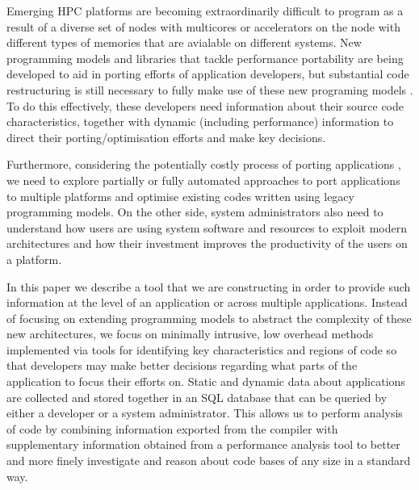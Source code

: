 Emerging HPC platforms are becoming extraordinarily difficult to program as a result of a diverse set of nodes with multicores or accelerators on the node with different types of memories that are avialable on different systems.
New programming models and libraries that tackle performance portability are being developed to aid in porting efforts of application developers, but substantial code restructuring is still necessary to fully make use of these new programing models \cite{anantharaj2013}\cite{titan}.
To do this effectively, these developers need information about their source code characteristics, together with dynamic (including performance) information to direct their porting/optimisation efforts and make key decisions.



Furthermore, considering the potentially costly process of porting applications \cite{larrea2016early}, we need to explore partially or fully automated approaches to port applications to multiple platforms and optimise existing codes written using legacy programming models.
On the other side, system administrators also need to understand how users are using system software and resources to exploit modern architectures and how their investment improves the productivity of the users on a platform.

In this paper we describe a tool that we are constructing in order to provide such information at the level of an application or across multiple applications.
Instead of focusing on extending programming models to abstract the complexity of these new architectures, we focus on minimally intrusive, low overhead methods implemented via tools for identifying key characteristics and regions of code so that developers may make better decisions regarding what parts of the application to focus their efforts on.
Static and dynamic data about applications are collected and stored together in an \acs{SQL} database that can be queried by either a developer or a system administrator.
This allows us to perform analysis of code by combining information exported from the compiler with supplementary information obtained from a performance analysis tool to better and more finely investigate and reason about code bases of any size in a standard way.

